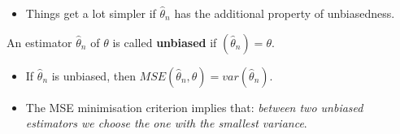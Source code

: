 \documentclass[notes=show]{beamer}
\begin{document}
\begin{frame}%


\begin{itemize}
\item Things get a lot simpler if $\hat{\theta}_{n}$ has the additional
property of unbiasedness.
\end{itemize}

\begin{definition}
An estimator $\hat{\theta}_{n}$ of $\theta $ is called \textbf{unbiased} if 
$\left( \hat{\theta}_{n}\right) =\theta $.
\end{definition}

\begin{itemize}
\item If $\hat{\theta}_{n}$ is unbiased, then $MSE\left( \hat{\theta}%
_{n},\theta \right) =var\left( \hat{\theta}_{n}\right) $.

\item The MSE minimisation criterion implies that: \textit{between two
unbiased estimators we choose the one with the smallest variance}.
\end{itemize}

\end{frame}%
\end{document}
